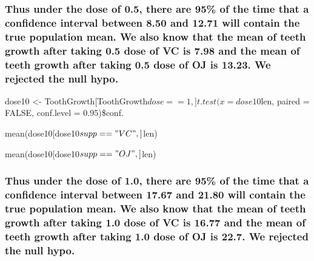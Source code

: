\documentclass[
]{article}
\begin{document}
\hypertarget{thus-under-the-dose-of-0.5-there-are-95-of-the-time-that-a-confidence-interval-between-8.50-and-12.71-will-contain-the-true-population-mean.-we-also-know-that-the-mean-of-teeth-growth-after-taking-0.5-dose-of-vc-is-7.98-and-the-mean-of-teeth-growth-after-taking-0.5-dose-of-oj-is-13.23.-we-rejected-the-null-hypo.}{%
\subsubsection{Thus under the dose of 0.5, there are 95\% of the time
that a confidence interval between 8.50 and 12.71 will contain the true
population mean. We also know that the mean of teeth growth after taking
0.5 dose of VC is 7.98 and the mean of teeth growth after taking 0.5
dose of OJ is 13.23. We rejected the null
hypo.}\label{thus-under-the-dose-of-0.5-there-are-95-of-the-time-that-a-confidence-interval-between-8.50-and-12.71-will-contain-the-true-population-mean.-we-also-know-that-the-mean-of-teeth-growth-after-taking-0.5-dose-of-vc-is-7.98-and-the-mean-of-teeth-growth-after-taking-0.5-dose-of-oj-is-13.23.-we-rejected-the-null-hypo.}}

dose10 \textless-
ToothGrowth{[}ToothGrowth\(dose == 1, ] t.test(x = dose10\)len, paired =
FALSE, conf.level = 0.95)\$conf.

mean(dose10{[}dose10\(supp == "VC", ]\)len)

mean(dose10{[}dose10\(supp == "OJ", ]\)len)

\hypertarget{thus-under-the-dose-of-1.0-there-are-95-of-the-time-that-a-confidence-interval-between-17.67-and-21.80-will-contain-the-true-population-mean.-we-also-know-that-the-mean-of-teeth-growth-after-taking-1.0-dose-of-vc-is-16.77-and-the-mean-of-teeth-growth-after-taking-1.0-dose-of-oj-is-22.7.-we-rejected-the-null-hypo.}{%
\subsubsection{Thus under the dose of 1.0, there are 95\% of the time
that a confidence interval between 17.67 and 21.80 will contain the true
population mean. We also know that the mean of teeth growth after taking
1.0 dose of VC is 16.77 and the mean of teeth growth after taking 1.0
dose of OJ is 22.7. We rejected the null
hypo.}\label{thus-under-the-dose-of-1.0-there-are-95-of-the-time-that-a-confidence-interval-between-17.67-and-21.80-will-contain-the-true-population-mean.-we-also-know-that-the-mean-of-teeth-growth-after-taking-1.0-dose-of-vc-is-16.77-and-the-mean-of-teeth-growth-after-taking-1.0-dose-of-oj-is-22.7.-we-rejected-the-null-hypo.}}
\end{document}
